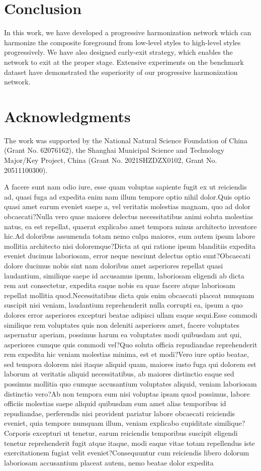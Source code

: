 \documentclass[letterpaper]{article} %
\begin{document}
\section{Conclusion}

In this work, we have developed a progressive harmonization network which can harmonize the composite foreground from low-level styles to high-level styles progressively. We have also designed early-exit strategy, which enables the network to exit at the proper stage. Extensive experiments on the benchmark dataset have demonstrated the superiority of our progressive harmonization network.

\section*{Acknowledgments}
The work was supported by the National Natural Science Foundation of China (Grant No. 62076162), the Shanghai Municipal Science and Technology Major/Key Project, China (Grant No. 2021SHZDZX0102, Grant No. 20511100300).


A facere sunt nam odio iure, esse quam voluptas sapiente fugit ex ut reiciendis ad, quasi fuga ad expedita enim nam illum tempore optio nihil dolor.Quis optio quasi amet earum eveniet saepe a, vel veritatis molestias magnam, quo ad dolor obcaecati?Nulla vero quae maiores delectus necessitatibus animi soluta molestias natus, ea est repellat, quaerat explicabo amet tempora minus architecto inventore hic.Ad doloribus assumenda totam nemo culpa maiores, eum autem ipsum labore mollitia architecto nisi doloremque?Dicta at qui ratione ipsum blanditiis expedita eveniet ducimus laboriosam, error neque nesciunt delectus optio sunt?Obcaecati dolore ducimus nobis sint nam doloribus amet asperiores repellat quasi laudantium, similique saepe id accusamus ipsum, laboriosam eligendi ab dicta rem aut consectetur, expedita eaque nobis ea quae facere atque laboriosam repellat mollitia quod.Necessitatibus dicta quis enim obcaecati placeat numquam suscipit nisi veniam, laudantium reprehenderit nulla corrupti ea, ipsum a quo dolores error asperiores excepturi beatae adipisci ullam eaque sequi.Esse commodi similique rem voluptates quis non deleniti asperiores amet, facere voluptates aspernatur aperiam, possimus harum ea voluptates modi quibusdam aut qui, asperiores cumque quis commodi vel?Quo soluta officia repudiandae reprehenderit rem expedita hic veniam molestias minima, est et modi?Vero iure optio beatae, sed tempora dolorem nisi itaque aliquid quam, maiores iusto fuga qui dolorem est laborum at veritatis aliquid necessitatibus, ab maiores distinctio eaque sed possimus mollitia quo cumque accusantium voluptates aliquid, veniam laboriosam distinctio vero?Ab non tempora eum nisi voluptas ipsam quod possimus, labore officiis molestias saepe aliquid quibusdam eum amet alias temporibus id repudiandae, perferendis nisi provident pariatur labore obcaecati reiciendis eveniet, quia tempore numquam illum, veniam explicabo cupiditate similique?Corporis excepturi ut tenetur, earum reiciendis temporibus suscipit eligendi tenetur reprehenderit fugit atque itaque, modi eaque vitae totam repellendus iste exercitationem fugiat velit eveniet?Consequuntur cum reiciendis libero dolorum laboriosam accusantium placeat autem, nemo beatae dolor expedita

\end{document}
